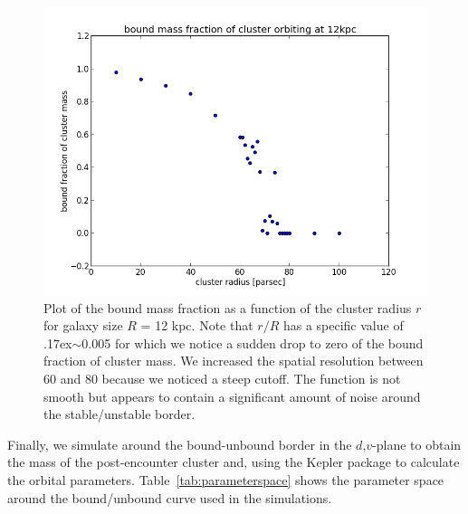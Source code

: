 \documentclass{aa}
\newcommand{\mytilde}{\raise.17ex\hbox{$\scriptstyle\mathtt{\sim}$}}
\begin{document}
  \begin{figure}
   \centering
   \includegraphics[width=\hsize]{img/bound_mass_at_12000_pc.png}
      \caption{Plot of the bound mass fraction as a function of the cluster radius $r$ for galaxy size $R$ =  12 kpc.
      		   Note that $r/R$ has a specific value of \mytilde 0.005 for which we notice a sudden drop to zero of the bound fraction of cluster mass.
		   We increased the spatial resolution between 60 and 80 because we noticed a steep cutoff. The function is not smooth but appears to 
		   contain a significant amount of noise around the stable/unstable border. 
              }
         \label{fig:bound_mass_extra_res}
   \end{figure}

Finally, we simulate around the bound-unbound border in the $d$,$v$-plane to obtain the mass of the post-encounter cluster and, using the Kepler package \citep{REPLACE} to calculate the orbital parameters. Table~\ref{tab:parameterspace} shows the parameter space around the bound/unbound curve used in the simulations.
\end{document}
